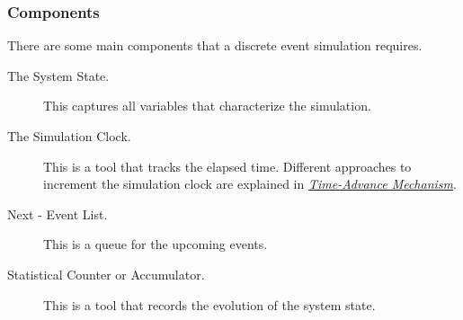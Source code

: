 \subsubsection{Components}
\label{des:components}

There are some main components that a discrete event simulation requires.

\begin{description}

\item[The System State.] This captures all variables that characterize the simulation.

\item[The Simulation Clock.] This is a tool that tracks the elapsed time. Different approaches to increment the simulation clock are explained in \hyperref[des:timeadvance]{\textit{Time-Advance Mechanism}}.

\item[Next - Event List.] This is a queue for the upcoming events.

\item[Statistical Counter or Accumulator.] This is a tool that records the evolution of the system state.


\end{description}
%
%
%
%

%
%


